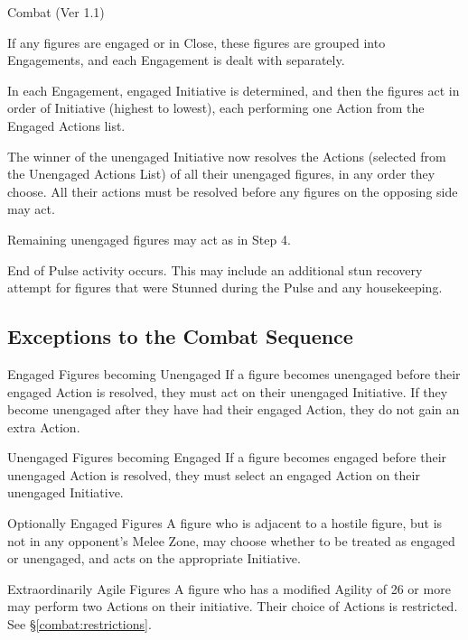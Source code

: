 \begin{Chapter}{Combat (Ver 1.1)}
\begin{Enumerate}
\item If any figures are engaged or in Close, these figures are
  grouped into Engagements, and each Engagement is dealt with
  separately.

\item In each Engagement, engaged Initiative is determined, and then
  the figures act in order of Initiative (highest to lowest), each
  performing one Action from the Engaged Actions list.

\item The winner of the unengaged Initiative now resolves the Actions
  (selected from the Unengaged Actions List) of all their unengaged
  figures, in any order they choose.  All their actions must be
  resolved before any figures on the opposing side may act.

\item Remaining unengaged figures may act as in Step 4.

\item End of Pulse activity occurs.  This may include an additional
  stun recovery attempt for figures that were Stunned during the Pulse
  and any housekeeping.

\end{Enumerate}

\subsection{Exceptions to the Combat Sequence}

\begin{Description}

\item[Engaged Figures becoming Unengaged] If a figure becomes
  unengaged before their engaged Action is resolved, they must act on
  their unengaged Initiative.  If they become unengaged after they
  have had their engaged Action, they do not gain an extra Action.

\item[Unengaged Figures becoming Engaged] If a figure becomes engaged
  before their unengaged Action is resolved, they must select an
  engaged Action on their unengaged Initiative.

\item[Optionally Engaged Figures] A figure who is adjacent to a
  hostile figure, but is not in any opponent’s Melee Zone, may choose
  whether to be treated as engaged or unengaged, and acts on the
  appropriate Initiative.

\item[Extraordinarily Agile Figures] A figure who has a modified
  Agility of 26 or more may perform two Actions on their
  initiative. Their choice of Actions is restricted. See
  \S\ref{combat:restrictions}.


\end{Description}
\end{Chapter}

